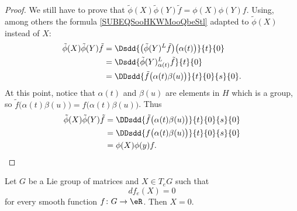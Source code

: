 \begin{proof}
    We still have to prove that \( \tilde \phi(X)\tilde \phi(Y)\tilde f=\phi(X)\phi(Y)f\). Using, among others the formula \ref{SUBEQSooHKWMooQbeStl} adapted to \( \tilde \phi(X)\) instead of \( X\):
    \begin{subequations}
        \begin{align}
            \tilde \phi(X)\tilde \phi(Y)\tilde f&=\Dsdd{ \big( \tilde \phi(Y)^L\tilde f \big)\big( \alpha(t) \big) }{t}{0}\\
            &=\Dsdd{ \tilde \phi(Y)^L_{\alpha(t)}\tilde f }{t}{0}\\
            &=\DDsdd{ \tilde f\big( \alpha(t)\beta(u) \big) }{t}{0}{s}{0}.
        \end{align}
    \end{subequations}
    At this point, notice that \( \alpha(t)\) and \( \beta(u)\) are elements in \( H\) which is a group, so \( \tilde f\big( \alpha(t)\beta(u) \big)=f\big( \alpha(t)\beta(u) \big)\). Thus
    \begin{subequations}
        \begin{align}
            \tilde \phi(X)\tilde \phi(Y)\tilde f&=\DDsdd{ \tilde f\big( \alpha(t)\beta(u) \big) }{t}{0}{s}{0}\\
            &=\DDsdd{ f\big( \alpha(t)\beta(u) \big) }{t}{0}{s}{0}\\
            &=\phi(X)\phi(y)f.
        \end{align}
    \end{subequations}
\end{proof}

\begin{lemma}
    Let \( G\) be a Lie group of matrices and \( X\in T_eG\) such that 
    \begin{equation}
        df_e(X)=0
    \end{equation}
    for every smooth function \( f\colon G\to \eR\). Then \( X=0\).
\end{lemma}


